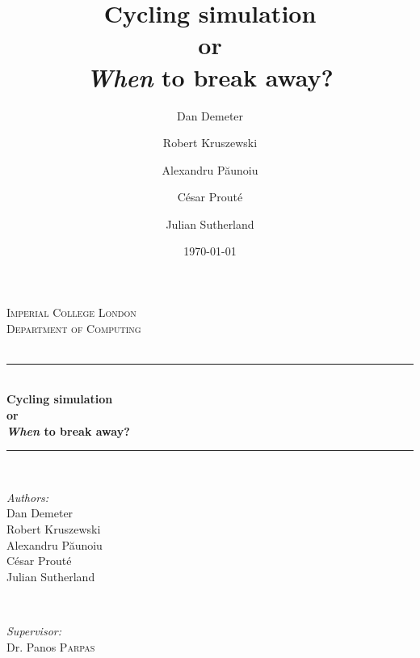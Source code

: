 \documentclass[10pt, a4paper]{report}
\title{Cycling simulation\\or\\\textit{When} to break away?}
\date{\today}
\author{Dan Demeter\and Robert Kruszewski\and Alexandru P\u{a}unoiu \and C\'esar Prout\'e \and Julian Sutherland}
\begin{document}
\begin{titlepage}

\newcommand{\HRule}{\rule{\linewidth}{0.5mm}} %

\center %


\textsc{\LARGE Imperial College London}\\[1.5cm] %
\textsc{\Large Department of Computing}\\[0.5cm] %
\textsc{\large}\\[0.5cm] %


\HRule \\[0.4cm]
{ \huge \bfseries Cycling simulation\\or\\\vspace{0.4cm}\textit{When} to break away?}\\[0.4cm] %
\HRule \\[1.5cm]


\begin{minipage}{0.4\textwidth}
\begin{flushleft} \large
\emph{Authors:}\\
Dan Demeter \\
Robert Kruszewski\\
Alexandru P\u{a}unoiu\\
C\'esar Prout\'e\\
Julian Sutherland
\end{flushleft}
\end{minipage}
~
\begin{minipage}{0.4\textwidth}
\begin{flushright} \large
\emph{Supervisor:} \\
Dr. Panos \textsc{Parpas} \\%
\end{flushright}
\end{minipage}\\[5cm]


\end{titlepage}
\end{document}
